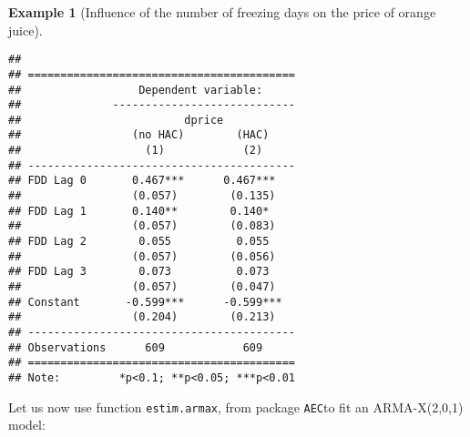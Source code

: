 \documentclass[
  12pt,
]{book}
\newenvironment{Shaded}{\begin{snugshade}}{\end{snugshade}}
\newcommand{\AttributeTok}[1]{\textcolor[rgb]{0.77,0.63,0.00}{#1}}
\newcommand{\CommentTok}[1]{\textcolor[rgb]{0.56,0.35,0.01}{\textit{#1}}}
\newcommand{\ControlFlowTok}[1]{\textcolor[rgb]{0.13,0.29,0.53}{\textbf{#1}}}
\newcommand{\DecValTok}[1]{\textcolor[rgb]{0.00,0.00,0.81}{#1}}
\newcommand{\FunctionTok}[1]{\textcolor[rgb]{0.00,0.00,0.00}{#1}}
\newcommand{\NormalTok}[1]{#1}
\newcommand{\OtherTok}[1]{\textcolor[rgb]{0.56,0.35,0.01}{#1}}
\newcommand{\SpecialCharTok}[1]{\textcolor[rgb]{0.00,0.00,0.00}{#1}}
\theoremstyle{definition}
\theoremstyle{definition}
\newtheorem{example}{Example}[chapter]
\theoremstyle{definition}
\theoremstyle{definition}
\theoremstyle{remark}
\begin{document}
\begin{example}[Influence of the number of freezing days on the price of orange juice]
\begin{verbatim}
## 
## =========================================
##                  Dependent variable:     
##              ----------------------------
##                         dprice           
##                 (no HAC)        (HAC)    
##                   (1)            (2)     
## -----------------------------------------
## FDD Lag 0       0.467***      0.467***   
##                 (0.057)        (0.135)   
## FDD Lag 1       0.140**        0.140*    
##                 (0.057)        (0.083)   
## FDD Lag 2        0.055          0.055    
##                 (0.057)        (0.056)   
## FDD Lag 3        0.073          0.073    
##                 (0.057)        (0.047)   
## Constant       -0.599***      -0.599***  
##                 (0.204)        (0.213)   
## -----------------------------------------
## Observations      609            609     
## =========================================
## Note:         *p<0.1; **p<0.05; ***p<0.01
\end{verbatim}

Let us now use function \texttt{estim.armax}, from package \texttt{AEC}to fit an ARMA-X(2,0,1) model:

\begin{Shaded}
\end{Shaded}


\end{example}
\end{document}
